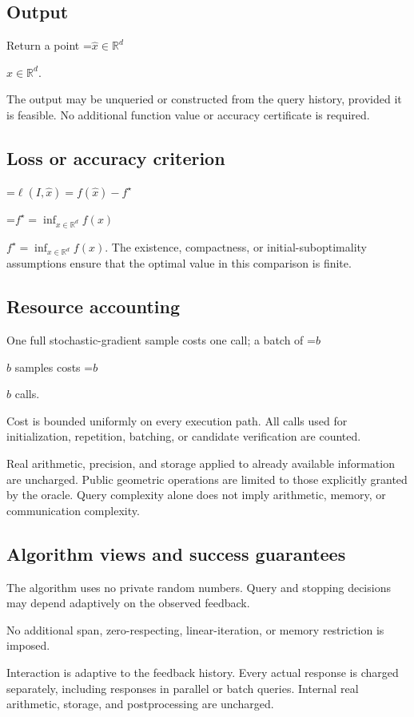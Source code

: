 \documentclass[10pt,a4paper]{article}
\newcommand{\AtlasMath}[1]{\par\begingroup\centering\setbox0=\hbox{$\displaystyle #1$}\ifdim\wd0>1.4\linewidth\typeout{ATLAS WIDE FORMULA: \the\wd0}\fi\ifdim\wd0>\linewidth\resizebox{\linewidth}{!}{\box0}\else\box0\fi\par\endgroup}
\newcommand{\AtlasInlineMath}[1]{\begingroup\setbox0=\hbox{$#1$}\ifdim\wd0>.4\linewidth\endgroup\AtlasMath{#1}\else\endgroup$#1$\fi}
\begin{document}
\subsection{Output}
Return a point \AtlasInlineMath{\widehat x\in\mathbb R^d}.

The output may be unqueried or constructed from the query history, provided it is feasible. No additional function value or accuracy certificate is required.

\subsection{Loss or accuracy criterion}

\AtlasMath{\ell(I,\widehat{x})=f(\widehat{x})-f^\star}


\AtlasInlineMath{f^\star=\inf_{x\in \mathbb{R}^d}f(x)}. The existence, compactness, or initial-suboptimality assumptions ensure that the optimal value in this comparison is finite.

\subsection{Resource accounting}
One full stochastic-gradient sample costs one call; a batch of \AtlasInlineMath{b} samples costs \AtlasInlineMath{b} calls.

Cost is bounded uniformly on every execution path. All calls used for initialization, repetition, batching, or candidate verification are counted.

Real arithmetic, precision, and storage applied to already available information are uncharged. Public geometric operations are limited to those explicitly granted by the oracle. Query complexity alone does not imply arithmetic, memory, or communication complexity.

\subsection{Algorithm views and success guarantees}
The algorithm uses no private random numbers. Query and stopping decisions may depend adaptively on the observed feedback.

No additional span, zero-respecting, linear-iteration, or memory restriction is imposed.

Interaction is adaptive to the feedback history. Every actual response is charged separately, including responses in parallel or batch queries. Internal real arithmetic, storage, and postprocessing are uncharged.
\end{document}
